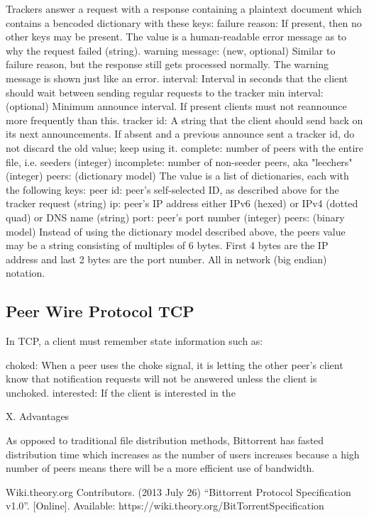 \documentclass[letter]{scrartcl}
\begin{document}
Trackers answer a request with a response containing a plaintext document which contains a bencoded dictionary with these keys:
failure reason: If present, then no other keys may be present. The value is a human-readable error message as to why the request failed (string).
warning message: (new, optional) Similar to failure reason, but the response still gets processed normally. The warning message is shown just like an error.
interval: Interval in seconds that the client should wait between sending regular requests to the tracker
min interval: (optional) Minimum announce interval. If present clients must not reannounce more frequently than this.
tracker id: A string that the client should send back on its next announcements. If absent and a previous announce sent a tracker id, do not discard the old value; keep using it.
complete: number of peers with the entire file, i.e. seeders (integer)
incomplete: number of non-seeder peers, aka "leechers" (integer)
peers: (dictionary model) The value is a list of dictionaries, each with the following keys:
peer id: peer's self-selected ID, as described above for the tracker request (string)
ip: peer's IP address either IPv6 (hexed) or IPv4 (dotted quad) or DNS name (string)
port: peer's port number (integer)
peers: (binary model) Instead of using the dictionary model described above, the peers value may be a string consisting of multiples of 6 bytes. First 4 bytes are the IP address and last 2 bytes are the port number. All in network (big endian) notation.

\subsection{Peer Wire Protocol TCP}

In TCP, a client must remember state information such as:

choked: When a peer uses the choke signal, it is letting the other peer’s client know that notification requests will not be answered unless the client is unchoked. 
interested: If the client is interested in the 

X. Advantages

As opposed to traditional file distribution methods, Bittorrent has fasted distribution time which increases as the number of users increases because a high number of peers means there  will be a more efficient use of bandwidth. 

Wiki.theory.org Contributors. (2013 July 26) “Bittorrent Protocol Specification v1.0”. [Online]. Available: https://wiki.theory.org/BitTorrentSpecification
\end{document}
